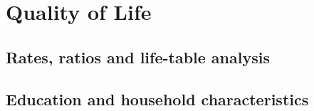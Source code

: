 \section{Quality of Life}
\subsection{Rates, ratios and life-table analysis}
\subsection{Education and household characteristics}